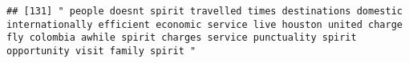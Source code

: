 \documentclass[
]{article}
\begin{document}
\begin{verbatim}
## [131] " people doesnt spirit travelled times destinations domestic internationally efficient economic service live houston united charge fly colombia awhile spirit charges service punctuality spirit opportunity visit family spirit "                                                                                                                                                                                                                                                                                                                                                                                                                                                                                                                                                                                                                                                                                                                                                                                                                                                                                                                                                                                                                                                                                                                                                                                                                                                                                                                                                                                                                                                                                                                                                              

\end{verbatim}
\end{document}
